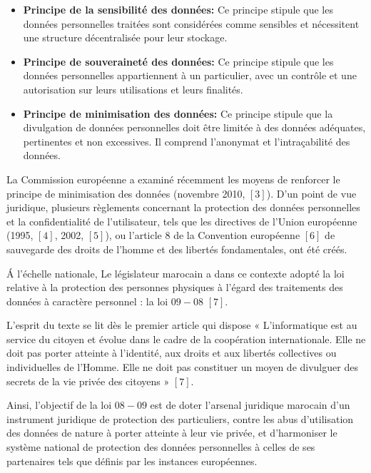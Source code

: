 \begin{itemize}
	\item \textbf{Principe de la sensibilité des données:} Ce principe stipule que les données personnelles traitées sont considérées comme sensibles et nécessitent une structure décentralisée pour leur stockage.
	\item \textbf{Principe de souveraineté des données:} Ce principe stipule que les données personnelles appartiennent à un particulier, avec un contrôle et une autorisation sur leurs utilisations et leurs finalités.
	\item \textbf{Principe de minimisation des données:} Ce principe stipule que la divulgation de données personnelles doit être limitée à des données adéquates, pertinentes et non excessives. Il comprend l’anonymat et l’intraçabilité des données.
\end{itemize}

\vspace{6pt}
\paragraphmark

La Commission européenne a examiné récemment les moyens de renforcer le principe de minimisation des données (novembre 2010, $[3]$). D’un point de vue juridique, plusieurs règlements concernant la protection des données personnelles et la confidentialité de l’utilisateur, tels que les directives de
l’Union européenne (1995, $[4]$, 2002, $[5]$), ou l’article 8 de la Convention européenne $[6]$ de sauvegarde des droits de l’homme et des libertés fondamentales, ont été créés.

\vspace{6pt}
\paragraphmark

\'A l'échelle nationale, Le législateur marocain a dans ce contexte adopté  la loi relative à la protection des personnes physiques à l’égard des traitements des données à caractère personnel : la loi $09-08$ $[7]$.

\vspace{6pt}
\paragraphmark

L’esprit du texte se lit dès le premier article qui dispose « L’informatique est au service du citoyen et évolue dans le cadre de la coopération internationale. Elle ne doit pas porter atteinte à l’identité, aux droits et aux libertés collectives ou individuelles de l’Homme. Elle ne doit pas constituer un moyen de divulguer des secrets de la vie privée des citoyens » $[7]$.

\vspace{6pt}
\paragraphmark

Ainsi, l’objectif de la loi $08-09$ est de doter l’arsenal juridique marocain d’un instrument juridique de protection des particuliers, contre les abus d’utilisation des données de nature à porter atteinte à leur vie privée, et d’harmoniser le système national de protection des données personnelles à celles de ses partenaires tels que définis par les instances européennes.








